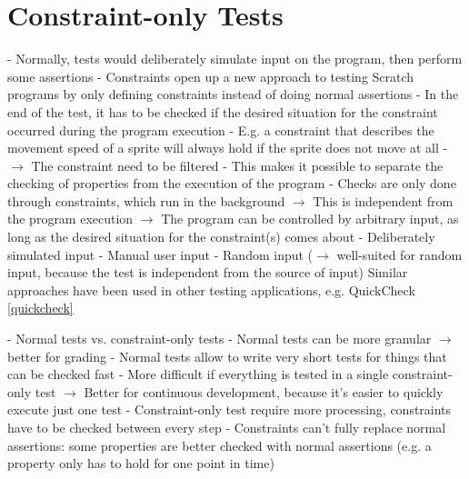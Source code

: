 \section{Constraint-only Tests}%
\label{sec:constraint_only_tests}

- Normally, tests would deliberately simulate input on the program, then perform some assertions
- Constraints open up a new approach to testing Scratch programs by only defining constraints instead of doing normal assertions
- In the end of the test, it has to be checked if the desired situation for the constraint occurred during the program execution
    - E.g. a constraint that describes the movement speed of a sprite will always hold if the sprite does not move at all
    - $\rightarrow$ The constraint need to be filtered
- This makes it possible to separate the checking of properties from the execution of the program
    - Checks are only done through constraints, which run in the background
    $\rightarrow$ This is independent from the program execution
    $\rightarrow$ The program can be controlled by arbitrary input, as long as the desired situation for the constraint(s) comes about
        - Deliberately simulated input
        - Manual user input
        - Random input ($\rightarrow$ well-suited for random input, because the test is independent from the source of input)
          Similar approaches have been used in other testing applications, e.g. QuickCheck \ref{quickcheck}

- Normal tests vs. constraint-only tests
    - Normal tests can be more granular $\rightarrow$ better for grading
    - Normal tests allow to write very short tests for things that can be checked fast
        - More difficult if everything is tested in a single constraint-only test
        $\rightarrow$ Better for continuous development, because it's easier to quickly execute just one test
    - Constraint-only test require more processing, constraints have to be checked between every step
    - Constraints can't fully replace normal assertions: some properties are better checked with normal assertions (e.g. a property only has to hold for one point in time)

